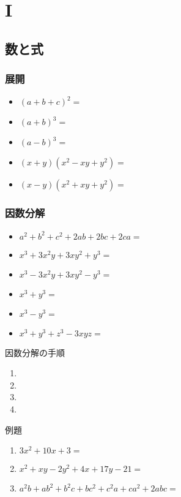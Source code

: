 \documentclass[10pt,dvipdfmx]{jsarticle}
\begin{document}
\section*{I}
\subsection*{数と式}
\subsubsection*{展開}
\begin{Large}
  \begin{itemize}
    \item $(a+b+c)^2=$
    \item $(a+b)^3=$
    \item $(a-b)^3=$
    \item $(x+y)(x^2-xy+y^2)=$
    \item $(x-y)(x^2+xy+y^2)=$
  \end{itemize}
\end{Large}

\subsubsection*{因数分解}
\begin{Large}
  \begin{itemize}
    \item $a^2+b^2+c^2+2ab+2bc+2ca=$
    \item $x^3+3x^2y+3xy^2+y^3=$
    \item  $x^3-3x^2y+3xy^2-y^3=$
    \item $x^3+y^3=$
    \item $x^3-y^3=$
    \item $x^3+y^3+z^3-3xyz=$
  \end{itemize}
\end{Large}
\begin{itembox}[l]{因数分解の手順}
  \begin{Large}
    \begin{enumerate}
      \item %
      \item %
      \item %
      \item %
    \end{enumerate}
  \end{Large}
\end{itembox}

\begin{itembox}[l]{例題}
  \begin{large}
    \begin{enumerate}
      \item $3x^2+10x+3=$
      \item $x^2+xy-2y^2+4x+17y-21=$
      \item $a^2b+ab^2+b^2c+bc^2+c^2a+ca^2+2abc=$
    \end{enumerate}
  \end{large}
\end{itembox}
\end{document}

